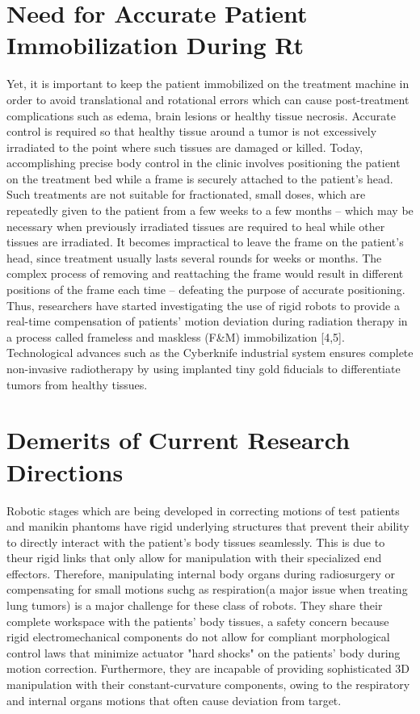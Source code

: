 \documentclass[12pt,a4paper]{article}
\begin{document}
\section{Need for Accurate Patient Immobilization During Rt}
Yet, it is important to keep the patient immobilized on the treatment machine in order to avoid translational and rotational errors which can cause post-treatment complications such as edema, brain lesions or healthy tissue necrosis. Accurate control is required so that healthy tissue around a tumor is not excessively irradiated to the point where such tissues are damaged or killed. Today, accomplishing precise body control in the clinic involves positioning the patient on the treatment bed while  a frame is securely attached to the patient's head. Such treatments are not suitable for fractionated, small doses, which are repeatedly given to the patient from a few weeks to a few months -- which may be necessary when previously irradiated tissues are required to heal while other tissues are irradiated. It becomes impractical to leave the frame on the patient's head, since treatment usually lasts several rounds for weeks or months. The complex process of removing and reattaching the frame would result in different positions of the frame each time -- defeating the purpose of accurate positioning. Thus, researchers have started investigating the use of rigid robots to provide a real-time compensation of patients' motion deviation during radiation therapy in a process called frameless and maskless (F\&M) immobilization [4,5]. Technological advances such as the  Cyberknife industrial system ensures complete non-invasive radiotherapy by using implanted tiny gold fiducials to differentiate tumors from healthy tissues. 

\section{Demerits of Current Research Directions}
Robotic stages which are being developed in correcting motions of test patients and manikin phantoms have rigid underlying structures that prevent their ability to directly interact with the patient's body tissues seamlessly. This is due to theur rigid links that only allow for manipulation with their specialized end effectors. Therefore, manipulating internal body organs during radiosurgery or compensating for small motions suchg as respiration(a major issue when treating lung tumors) is a major challenge for these class of robots. They share their complete workspace with the patients' body tissues, a safety concern because rigid electromechanical components do not allow for compliant morphological control laws that minimize actuator "hard shocks" on the patients' body during motion correction. Furthermore, they are incapable of providing sophisticated 3D manipulation with their constant-curvature components, owing to the respiratory and internal organs motions that often cause deviation from target. 
\end{document}
